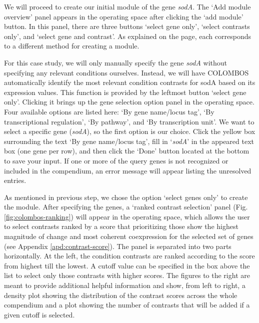 \begin{adjustwidth}{5mm}{0cm}
We will proceed to create our initial module of the gene \textit{sodA}. The 
`Add module overview' panel appears in the operating space after clicking the 
`add module' button. In this panel, there are three buttons `select gene only', 
`select contrasts only', and `select gene and contrast'. As explained on the 
page, each corresponds to a different method for creating a module.
\end{adjustwidth}

\begin{adjustwidth}{5mm}{0cm}
For this case study, we will only manually specify the gene \textit{sodA} 
without specifying any relevant conditions ourselves.  Instead, we will have 
COLOMBOS automatically identify the most relevant condition contrasts for sodA 
based on its expression values. This function is provided by the leftmost 
button `select gene only'. Clicking it brings up the gene selection option 
panel in the operating space. Four available options are listed here: `By gene 
name/locus tag', `By transcriptional regulation', `By pathway', and `By 
transcription unit'. We want to select a specific gene (\textit{sodA}), so the 
first option is our choice. Click the yellow box surrounding the text `By gene 
name/locus tag', fill in `\textit{sodA}' in the appeared text box (one gene per 
row), and then click the `Done' button located at the bottom to save your 
input. If one or more of the query genes is not recognized or included in the 
compendium, an error message will appear listing the unresolved entries.
\end{adjustwidth}

\begin{adjustwidth}{5mm}{0cm}
	As mentioned in previous step, we chose the option 
`select genes only' to create the module. After specifying the genes, a `ranked 
contrast selection' panel (Fig. \ref{fig:colombos-ranking}) will appear in the 
operating space, 
which allows the user to select contrasts ranked by a score that prioritizing 
those show the highest magnitude of change and most coherent coexpression for 
the selected set of genes (see Appendix \ref{apd:contrast-score}). The panel is 
separated into two parts horizontally. 
At the left, the condition contrasts are ranked according to the 
score from highest till the lowest. A cutoff value can be specified in the box 
above the list to select only those contrasts with higher scores. The 
figures to the right are meant to provide additional helpful information and 
show, from left to right, a density plot showing the distribution of the 
contrast scores across the whole compendium and a plot showing the number of 
contrasts that will be added if a given cutoff is selected.
\end{adjustwidth}


